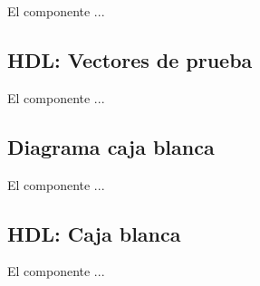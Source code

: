 	El componente ...
\subsection{HDL: Vectores de prueba}
\scriptsize

\normalsize

	El componente ...
\subsection{Diagrama caja blanca}
\scriptsize

\normalsize

	El componente ...
\subsection{HDL: Caja blanca}
\scriptsize

\normalsize

	El componente ...
